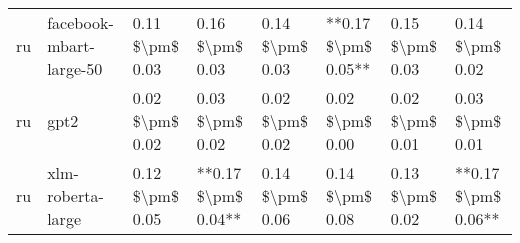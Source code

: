 \begin{tabular}{llllllll}
      ru &            facebook-mbart-large-50 & 0.11 \$\textbackslash pm\$ 0.03 &           0.16 \$\textbackslash pm\$ 0.03 &       0.14 \$\textbackslash pm\$ 0.03 &    **0.17 \$\textbackslash pm\$ 0.05** &                         0.15 \$\textbackslash pm\$ 0.03 &     0.14 \$\textbackslash pm\$ 0.02 \\
      ru &                               gpt2 & 0.02 \$\textbackslash pm\$ 0.02 &           0.03 \$\textbackslash pm\$ 0.02 &       0.02 \$\textbackslash pm\$ 0.02 &        0.02 \$\textbackslash pm\$ 0.00 &                         0.02 \$\textbackslash pm\$ 0.01 &     0.03 \$\textbackslash pm\$ 0.01 \\
      ru &                  xlm-roberta-large & 0.12 \$\textbackslash pm\$ 0.05 &       **0.17 \$\textbackslash pm\$ 0.04** &       0.14 \$\textbackslash pm\$ 0.06 &        0.14 \$\textbackslash pm\$ 0.08 &                         0.13 \$\textbackslash pm\$ 0.02 & **0.17 \$\textbackslash pm\$ 0.06** \\
\bottomrule
\end{tabular}
